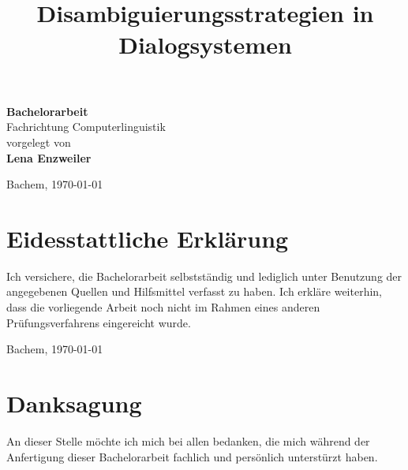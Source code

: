 \documentclass[12pt,a4paper]{scrartcl}
\title{$\,$\\  Disambiguierungsstrategien in Dialogsystemen}
\date{}
\author{}
\begin{document}


\maketitle
\sffamily
\begin{center}
\huge
\textbf{Bachelorarbeit}\\
\vfill
\LARGE
Fachrichtung Computerlinguistik\\
\vfill
\normalsize
vorgelegt von\\
\Large
\textbf{Lena Enzweiler}\\
\vfill


\normalsize
Bachem,
\today

\end{center}

\thispagestyle{empty}
\rmfamily
\cleardoublepage


\section*{Eidesstattliche Erklärung}

Ich versichere, die Bachelorarbeit selbstständig und lediglich unter Benutzung der angegebenen Quellen und Hilfsmittel verfasst zu haben.
\newline
\newline
Ich erkläre weiterhin, dass die vorliegende Arbeit noch nicht im Rahmen eines anderen Prüfungsverfahrens eingereicht wurde.
\newline
\newline

Bachem, \today
\newpage

\section*{Danksagung}
An dieser Stelle möchte ich mich bei allen bedanken, die mich während der Anfertigung dieser Bachelorarbeit fachlich und persönlich unterstürzt haben.\\
\end{document}

